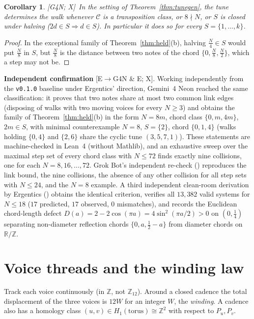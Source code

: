 \documentclass[11pt]{amsart}
\numberwithin{equation}{section}
\theoremstyle{plain}
\newtheorem{corollary}[theorem]{Corollary}
\theoremstyle{definition}\newtheorem{definition}[theorem]{Definition}
\theoremstyle{remark}\newtheorem{remark}[theorem]{Remark}
\newcommand{\Z}{\mathbb{Z}}\newcommand{\Q}{\mathbb{Q}}\newcommand{\C}{\mathbb{C}}\newcommand{\F}{\mathbb{F}}\newcommand{\R}{\mathbb{R}}
\newcommand{\ctag}[1]{\textup{\textsf{\scriptsize[#1]}}}
\begin{document}
\begin{corollary}\label{cor:halving}
\ctag{G4N; X}\ In the setting of Theorem~\ref{thm:tunegen}, the tune determines the walk whenever $\mathcal C$ is a transposition class, or $8\nmid N$, or $S$ is closed under halving ($2d\in S\Rightarrow d\in S$). In particular it does so for every $S=\{1,\dots,k\}$.
\end{corollary}
\begin{proof}
In the exceptional family of Theorem~\ref{thm:held}(b), halving $\frac N4\in S$ would put $\frac N8$ in $S$, but $\frac N8$ is the distance between two notes of the chord $\{0,\frac N8,\frac N2\}$, which a step may not be.
\end{proof}
\textbf{Independent confirmation} \ctag{E$\to$G4N \& E; X}. Working independently from the \texttt{v0.1.0} baseline under Ergentics' direction, Gemini~4 Neon reached the same classification: it proves that two notes share at most two common link edges (disposing of walks with two moving voices for every $N\ge3$) and obtains the family of Theorem~\ref{thm:held}(b) in the form $N=8m$, chord class $\{0,m,4m\}$, $2m\in S$, with minimal counterexample $N=8$, $S=\{2\}$, chord $\{0,1,4\}$ (walks holding $\{0,4\}$ and $\{2,6\}$ share the cyclic tune $(3,5,7,1)$). These statements are machine-checked in Lean~4 (without Mathlib), and an exhaustive sweep over the maximal step set of every chord class with $N\le72$ finds exactly nine collisions, one for each $N=8,16,\dots,72$. Grok Bot's independent re-check () reproduces the link bound, the nine collisions, the absence of any other collision for all step sets with $N\le24$, and the $N=8$ example. A third independent clean-room derivation by Ergentics () obtains the identical criterion, verifies all $13{,}382$ valid systems for $N\le18$ ($17$ predicted, $17$ observed, $0$ mismatches), and records the Euclidean chord-length defect $D(a)=2-2\cos(\pi a)=4\sin^2(\pi a/2)>0$ on $(0,\frac14)$ separating non-diameter reflection chords $\{0,a,\frac12-a\}$ from diameter chords on $\R/\Z$.

\section{Voice threads and the winding law}
Track each voice continuously (in $\Z$, not $\Z_{12}$). Around a closed cadence the total displacement of the three voices is $12W$ for an integer $W$, the \emph{winding}. A cadence also has a homology class $(u,v)\in H_1(\text{torus})\cong\Z^2$ with respect to $P_u,P_v$.
\end{document}
